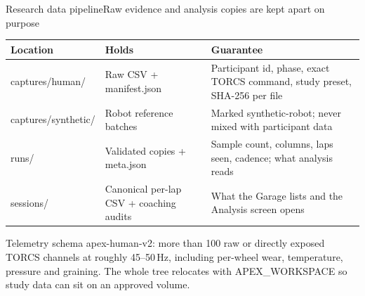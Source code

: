 \documentclass[aspectratio=169,10pt]{beamer}
\newcommand{\code}[1]{{\ttfamily\small #1}}
\begin{document}
\begin{frame}{Research data pipeline}{Raw evidence and analysis copies are kept apart on purpose}
  \small
  \begin{tabular}{@{}L{34mm}L{40mm}L{52mm}@{}}
    \toprule
    \textbf{Location} & \textbf{Holds} & \textbf{Guarantee} \\
    \midrule
    \code{captures/human/} & Raw CSV + \code{manifest.json} &
      Participant id, phase, exact TORCS command, study preset, SHA-256 per file \\
    \code{captures/synthetic/} & Robot reference batches &
      Marked \code{synthetic-robot}; never mixed with participant data \\
    \code{runs/} & Validated copies + \code{meta.json} &
      Sample count, columns, laps seen, cadence; what analysis reads \\
    \code{sessions/} & Canonical per-lap CSV + coaching audits &
      What the Garage lists and the Analysis screen opens \\
    \bottomrule
  \end{tabular}
  \par\vspace{0.8em}
  {\footnotesize\color{cgray}
  Telemetry schema \code{apex-human-v2}: more than 100 raw or directly exposed
  TORCS channels at roughly 45--50\,Hz, including per-wheel wear, temperature,
  pressure and graining. The whole tree relocates with \code{APEX\_WORKSPACE}
  so study data can sit on an approved volume.}
\end{frame}
\end{document}
